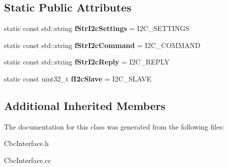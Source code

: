 \subsection*{Static Public Attributes}
\begin{DoxyCompactItemize}
\item 
\hypertarget{class_ph2___hw_interface_1_1_cbc_interface_ab45dcb5563c94075ac0a3e17d17c1fd4}{static const std\-::string {\bfseries f\-Str\-I2c\-Settings} = I2\-C\-\_\-\-S\-E\-T\-T\-I\-N\-G\-S}\label{class_ph2___hw_interface_1_1_cbc_interface_ab45dcb5563c94075ac0a3e17d17c1fd4}

\item 
\hypertarget{class_ph2___hw_interface_1_1_cbc_interface_a350e32baca2a50220eeff24b9fa07054}{static const std\-::string {\bfseries f\-Str\-I2c\-Command} = I2\-C\-\_\-\-C\-O\-M\-M\-A\-N\-D}\label{class_ph2___hw_interface_1_1_cbc_interface_a350e32baca2a50220eeff24b9fa07054}

\item 
\hypertarget{class_ph2___hw_interface_1_1_cbc_interface_a6a0730099e121a7707615ba6969afe80}{static const std\-::string {\bfseries f\-Str\-I2c\-Reply} = I2\-C\-\_\-\-R\-E\-P\-L\-Y}\label{class_ph2___hw_interface_1_1_cbc_interface_a6a0730099e121a7707615ba6969afe80}

\item 
\hypertarget{class_ph2___hw_interface_1_1_cbc_interface_ad5257bb9fac0efe9cb8307a04f51ef77}{static const uint32\-\_\-t {\bfseries f\-I2c\-Slave} = I2\-C\-\_\-\-S\-L\-A\-V\-E}\label{class_ph2___hw_interface_1_1_cbc_interface_ad5257bb9fac0efe9cb8307a04f51ef77}

\end{DoxyCompactItemize}
\subsection*{Additional Inherited Members}


The documentation for this class was generated from the following files\-:\begin{DoxyCompactItemize}
\item 
Cbc\-Interface.\-h\item 
Cbc\-Interface.\-cc\end{DoxyCompactItemize}
